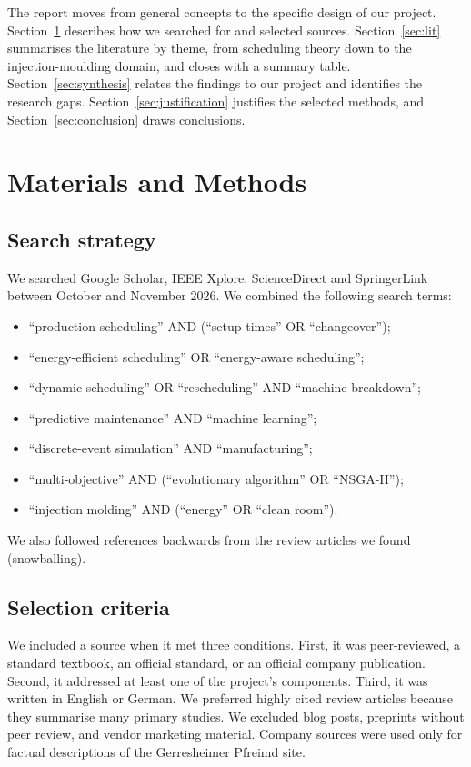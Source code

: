 \documentclass[11pt,a4paper]{article}
\begin{document}
The report moves from general concepts to the specific design of our project. Section~\ref{sec:methods} describes how we searched for and selected sources. Section~\ref{sec:lit} summarises the literature by theme, from scheduling theory down to the injection-moulding domain, and closes with a summary table. Section~\ref{sec:synthesis} relates the findings to our project and identifies the research gaps. Section~\ref{sec:justification} justifies the selected methods, and Section~\ref{sec:conclusion} draws conclusions.

\section{Materials and Methods}
\label{sec:methods}
\subsection{Search strategy}
We searched Google Scholar, IEEE Xplore, ScienceDirect and SpringerLink between October and November 2026. We combined the following search terms:
\begin{itemize}
  \item ``production scheduling'' AND (``setup times'' OR ``changeover'');
  \item ``energy-efficient scheduling'' OR ``energy-aware scheduling'';
  \item ``dynamic scheduling'' OR ``rescheduling'' AND ``machine breakdown'';
  \item ``predictive maintenance'' AND ``machine learning'';
  \item ``discrete-event simulation'' AND ``manufacturing'';
  \item ``multi-objective'' AND (``evolutionary algorithm'' OR ``NSGA-II'');
  \item ``injection molding'' AND (``energy'' OR ``clean room'').
\end{itemize}
We also followed references backwards from the review articles we found (snowballing).

\subsection{Selection criteria}
We included a source when it met three conditions. First, it was peer-reviewed, a standard textbook, an official standard, or an official company publication. Second, it addressed at least one of the project's components. Third, it was written in English or German. We preferred highly cited review articles because they summarise many primary studies. We excluded blog posts, preprints without peer review, and vendor marketing material. Company sources were used only for factual descriptions of the Gerresheimer Pfreimd site.
\end{document}
